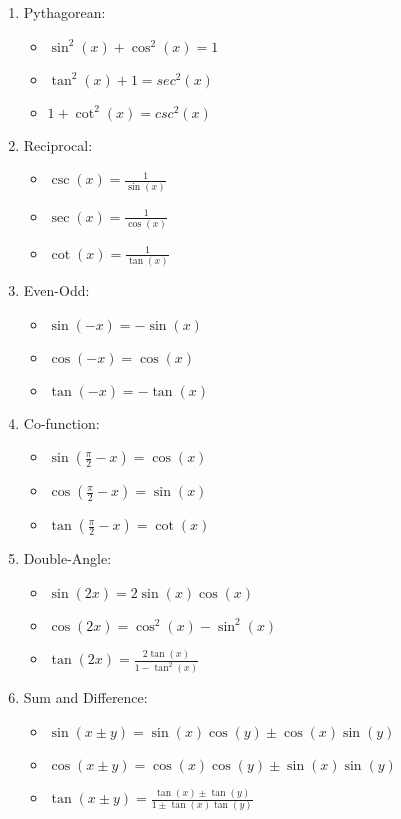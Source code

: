\documentclass{article}
\begin{document}
\begin{enumerate} 
	\item Pythagorean:
		\begin{itemize}
			\item $\sin^2(x) + \cos^2(x) = 1 $
			\item $\tan^2(x) + 1 = sec^2(x)$
			\item $1 + \cot^2(x) = csc^2(x)$
		\end{itemize}
	\item Reciprocal:
		\begin{itemize}
			\item $\csc(x) = \frac{1}{\sin(x)}$
			\item $\sec(x) = \frac{1}{\cos(x)}$
			\item $\cot(x) = \frac{1}{\tan(x)}$
		\end{itemize}
	\item Even-Odd:
		\begin{itemize}
			\item $\sin(-x) = -\sin(x)$
			\item $\cos(-x) = \cos(x)$
			\item $\tan(-x) = -\tan(x)$
		\end{itemize}
	\item Co-function:
		\begin{itemize}
			\item $\sin(\frac{\pi}{2}-x) = \cos(x)$
			\item $\cos(\frac{\pi}{2}-x) = \sin(x)$
			\item $\tan(\frac{\pi}{2}-x) = \cot(x)$
		\end{itemize}
	\item Double-Angle:
		\begin{itemize}
			\item $\sin(2x) = 2\sin(x)\cos(x)$
			\item $\cos(2x) = \cos^2(x) - \sin^2(x)$
			\item $\tan(2x) = \frac{2\tan(x)}{1-\tan^2(x)}$
		\end{itemize}
	\item Sum and Difference:
		\begin{itemize}
			\item $\sin(x \pm y) = \sin(x)\cos(y) \pm \cos(x)\sin(y)$
			\item $\cos(x \pm y) = \cos(x)\cos(y) \pm \sin(x)\sin(y)$
			\item $\tan(x \pm y) = \frac{\tan(x)\pm\tan(y)}{1\pm\tan(x)\tan(y)}$
		\end{itemize}
\end{enumerate}
	
\end{document}
